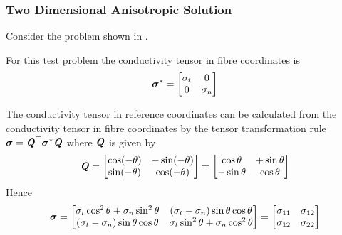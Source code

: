 \subsubsection{Two Dimensional Anisotropic Solution}

Consider the problem shown in .


For this test problem the conductivity tensor in fibre coordinates is
\begin{equation}
  \boldsymbol{\mathit{\sigma}}^{*}=\begin{bmatrix}
    \sigma_{t} & 0 \\ 
    0 & \sigma_{n}
  \end{bmatrix}
\end{equation}

The conductivity tensor in  reference coordinates can be calculated from the
conductivity tensor in  fibre coordinates by the tensor transformation rule
$\boldsymbol{\mathit{\sigma}}= {\boldsymbol{\mathit{Q}}}^{ \top } \boldsymbol{\mathit{\sigma}}^{*}\boldsymbol{\mathit{Q}}$ where
$\boldsymbol{\mathit{Q}}$ is given by
\begin{equation}
  \boldsymbol{\mathit{Q}}=\begin{bmatrix}
    \cos(-\theta) & -\sin(-\theta) \\
    \sin(-\theta) & \cos(-\theta)
  \end{bmatrix} = \begin{bmatrix}
    \cos\theta & +\sin\theta \\
    -\sin\theta & \cos\theta
  \end{bmatrix}
\end{equation}
Hence
\begin{equation}
  \tensor{\sigma}=\begin{bmatrix}
    \sigma_{t}\cos^{2}\theta+\sigma_{n}\sin^{2}\theta & 
    \pbrac{\sigma_{t}-\sigma_{n}}\sin\theta\cos\theta \\
    \pbrac{\sigma_{t}-\sigma_{n}}\sin\theta\cos\theta &
    \sigma_{t}\sin^{2}\theta+\sigma_{n}\cos^{2}\theta
  \end{bmatrix} = \begin{bmatrix}
    \sigma_{11} & \sigma_{12} \\
    \sigma_{12} & \sigma_{22} 
  \end{bmatrix}
  \label{eqn:conductivtytransformation}
\end{equation}

